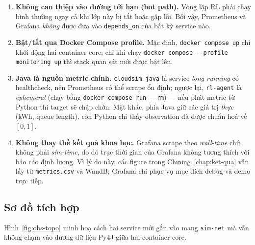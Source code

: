 \begin{enumerate}
  \item \textbf{Không can thiệp vào đường tới hạn (hot path).} Vòng
        lặp RL phải chạy bình thường ngay cả khi lớp này bị tắt hoặc
        gặp lỗi. Bởi vậy, Prometheus và Grafana \emph{không} được
        đưa vào \texttt{depends\_on} của bất kỳ service nào.
  \item \textbf{Bật/tắt qua Docker Compose profile.} Mặc định,
        \texttt{docker compose up} chỉ khởi động hai container core;
        chỉ khi chạy \texttt{docker compose -{}-profile monitoring up}
        thì stack quan sát mới được bật lên.
  \item \textbf{Java là nguồn metric chính.}
        \texttt{cloudsim-java} là service \emph{long-running} có
        healthcheck, nên Prometheus có thể scrape ổn định; ngược
        lại, \texttt{rl-agent} là \emph{ephemeral} (chạy bằng
        \texttt{docker compose run -{}-rm}) --- nếu phát metric từ
        Python thì target sẽ chập chờn. Mặt khác, phía Java giữ các
        giá trị \emph{thực} (kWh, queue length), còn Python chỉ
        thấy observation đã được chuẩn hoá về $[0,1]$.
  \item \textbf{Không thay thế kết quả khoa học.} Grafana scrape
        theo \emph{wall-time} chứ không phải \emph{sim-time}, do đó
        trục thời gian của Grafana không tương thích với báo cáo
        định lượng. Vì lý do này, các figure trong
        Chương~\ref{chap:ket-qua} vẫn lấy từ \texttt{metrics.csv}
        và WandB; Grafana chỉ phục vụ mục đích debug và demo trực
        tiếp.
\end{enumerate}

\subsection{Sơ đồ tích hợp}
Hình~\ref{fig:obs-topo} minh hoạ cách hai service mới gắn vào mạng
\texttt{sim-net} mà vẫn không chạm vào đường dữ liệu Py4J giữa hai
container core.

